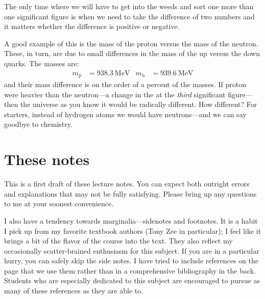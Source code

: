 \documentclass[12pt, oneside]{report}    %
\let\oldsection\section
\def\section{%
  \setcounter{sidenote}{1}%
  \oldsection
}
\begin{document}
The only time where we will have to get into the weeds and sort one more than one significant figure is when we need to take the difference of two numbers and it matters whether the difference is positive or negative.
\begin{example}
A good example of this is the mass of the proton versus the mass of the neutron. These, in turn, are due to small differences in the mass of the up versus the down quarks. The masses are:
\begin{align}
    m_\text{p} &= 938.3~\text{MeV}
    &
    m_\text{n} &= 939.6~\text{MeV}
\end{align}
and their mass difference is on the order of a percent of the masses. If proton were heavier than the neutron---a change in the at the \emph{third} significant figure---then the universe as you know it would be radically different. How different? For starters, instead of hydrogen atoms we would have neutrons---and we can say goodbye to chemistry.\sidenotemark
\end{example}


\section{These notes}

This is a first draft of these lecture notes. You can expect both outright errors and explanations that may not be fully satisfying. Please bring up any questions to me at your soonest convenience. 

I also have a tendency towards marginalia---sidenotes and footnotes. It is a habit I pick up from my favorite textbook authors (Tony Zee in particular); I feel like it brings a bit of the flavor of the course into the text. They also reflect my occasionally scatter-brained enthusiasm for this subject. If you are in a particular hurry, you can safely skip the side notes. I have tried to include references on the page that we use them rather than in a comprehensive bibliography in the back. Students who are especially dedicated to this subject are encouraged to pursue as many of these references as they are able to. 
\end{document}
